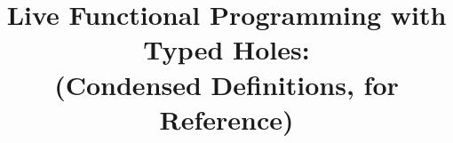 \documentclass[acmsmall,review,anonymous]{acmart}\settopmatter{printfolios=false,printccs=false,printacmref=false}
\begin{document}
\title{Live Functional Programming with Typed Holes:
  \\
  (Condensed Definitions, for Reference)
}

































\end{document}
